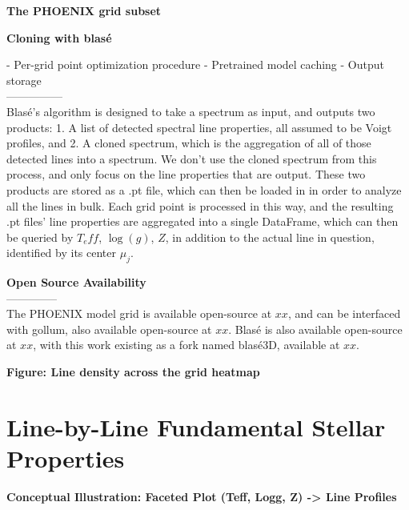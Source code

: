 \documentclass[twocolumn]{aastex631}
\begin{document}
\begin{mdframed}
    \textbf{The PHOENIX grid subset}

    \textcolor{lightgray}{\blindtext}
\end{mdframed}

\begin{mdframed}
    \textbf{Cloning with blas\'e}

    - Per-grid point optimization procedure
    - Pretrained model caching
    - Output storage
    \\---------------\\
    Blas\'e's algorithm is designed to take a spectrum as input, and outputs two products:
    1. A list of detected spectral line properties, all assumed to be Voigt profiles, and 2.
    A cloned spectrum, which is the aggregation of all of those detected lines into a spectrum. We
    don't use the cloned spectrum from this process, and only focus on the line properties that are output.
    These two products are stored as a .pt file, which can then be loaded in in order to 
    analyze all the lines in bulk. Each grid point is processed in this way, and the resulting .pt files'
    line properties are aggregated into a single DataFrame, which can then be queried by $T_eff$, $\log(g)$, $Z$,
    in addition to the actual line in question, identified by its center $\mu_j$.
\end{mdframed}

\begin{mdframed}
    \textbf{Open Source Availability}
    \\--------------\\
    The PHOENIX model grid is available open-source at $xx$, and can be interfaced with gollum,
    also available open-source at $xx$. Blas\'e is also available open-source at $xx$, with this work
    existing as a fork named blas\'e3D, available at $xx$.
\end{mdframed}

\begin{mdframed}
    \textbf{Figure: Line density across the grid heatmap}
\end{mdframed}


\section{Line-by-Line Fundamental Stellar Properties}
\begin{mdframed}
    \textbf{Conceptual Illustration: Faceted Plot (Teff, Logg, Z) -> Line Profiles}
\end{mdframed}
\end{document}
